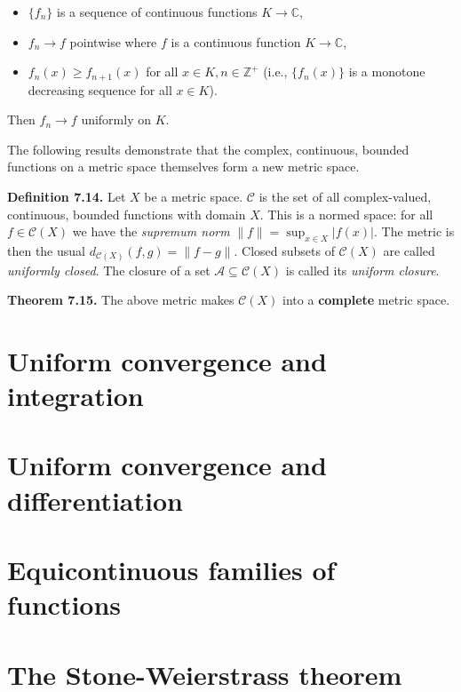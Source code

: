 \documentclass[a4paper]{article}
\newcommand{\C}{\mathbb{C}}
\newcommand{\Z}{\mathbb{Z}}
\begin{document}
\begin{itemize}
    \item $\{f_n\}$ is a sequence of continuous functions $K \to \C$,
    \item $f_n \to f$ pointwise where $f$ is a continuous function $K \to \C$,
    \item $f_n(x) \geq f_{n+1}(x)$ for all $x \in K, n \in \Z^+$ (i.e., $\{f_n(x)\}$ is a monotone decreasing sequence for all $x \in K$).
\end{itemize}

Then $f_n \to f$ uniformly on $K$.

The following results demonstrate that the complex, continuous, bounded functions on a metric space themselves form a new metric space.

\textbf{Definition 7.14.} Let $X$ be a metric space. $\mathscr{C}$ is the set of all complex-valued, continuous, bounded functions with domain $X$. This is a normed space: for all $f \in \mathscr{C}(X)$ we have the \emph{supremum norm} $\displaystyle \|f\| = \sup_{x \in X} |f(x)|$. The metric is then the usual $d_{\mathscr{C}(X)}(f, g) = \|f - g\|$. Closed subsets of $\mathscr{C}(X)$ are called \emph{uniformly closed}. The closure of a set $\mathscr{A} \subseteq \mathscr{C}(X)$ is called its \emph{uniform closure}.

\textbf{Theorem 7.15.} The above metric makes $\mathscr{C}(X)$ into a \textbf{complete} metric space.

\section{Uniform convergence and integration}

\section{Uniform convergence and differentiation}

\section{Equicontinuous families of functions}

\section{The Stone-Weierstrass theorem}
\end{document}
